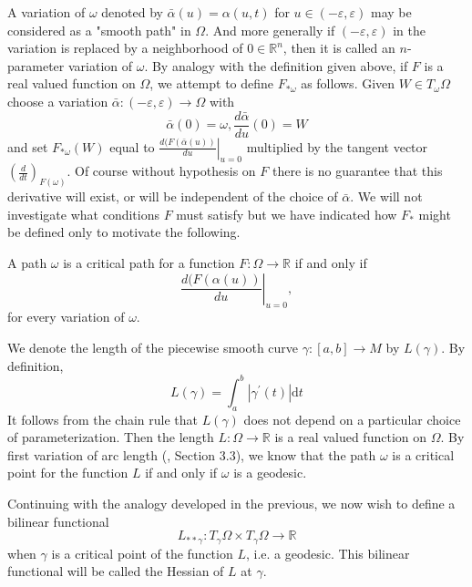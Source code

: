 \documentclass{ctexart}
\begin{document}
A variation of $\omega$ denoted by $\bar{\alpha}(u)=\alpha(u,t)$ for $u\in (-\varepsilon,\varepsilon)$ may be considered as a "smooth path" in $\Omega$. 
And more generally if $(-\varepsilon,\varepsilon)$ in the variation is replaced by a neighborhood of $0\in\mathbb{R}^n$, 
then it is called an $n$-parameter variation of $\omega$. By analogy with the definition given above, if $F$ is a real valued function on $\Omega$, 
we attempt to define $F_{*\omega}$
as follows. Given $W \in T_\omega \Omega$ choose a variation $\bar{\alpha}:(-\varepsilon, \varepsilon) \rightarrow \Omega$ with
$$
\bar{\alpha}(0)=\omega, \frac{d \bar{\alpha}}{d u}(0)=W
$$
and set $F_{* \omega}(W)$ equal to $\left.\frac{d(F(\bar{\alpha}(u))}{d u}\right|_{u=0}$ multiplied by the tangent vector
$\left(\frac{d}{d t}\right)_{F(\omega)}$. Of course without hypothesis on $F$ there is no guarantee that
this derivative will exist, or will be independent of the choice of $\bar{\alpha}$.
We will not investigate what conditions $F$ must satisfy but we have indicated how $F_*$ might be defined only to motivate the following.
\begin{definition}
  A path $\omega$ is a critical path for a function $F: \Omega\rightarrow \mathbb{R}$ if and only if
  $$
  \left.\frac{d(F(\alpha(u))}{d u}\right|_{u=0},
  $$
  for every variation of $\omega$. 
\end{definition}

We denote the length of the piecewise smooth curve $\gamma:[a, b] \rightarrow M$ by $L(\gamma)$. By definition,
$$
L(\gamma)=\int_a^b|\gamma^{\prime}(t)| \mathrm{d} t
$$
It follows from the chain rule that $L(\gamma)$ does not depend on a particular choice of parameterization. Then the length $L: \Omega\rightarrow\mathbb{R}$ is a real valued 
function on $\Omega$. By first variation of arc length (\cite{ChenWeiHuan2002}, Section 3.3), we know that the path $\omega$ is a critical point for the function $L$ if and only if $\omega$ is a geodesic.

Continuing with the analogy developed in the previous, we now wish to define a bilinear functional
$$
L_{* * \gamma}: T_\gamma \Omega\times T_\gamma \Omega\rightarrow \mathbb{R}
$$
when $\gamma$ is a critical point of the function $L$, i.e. a geodesic. This bilinear functional will be called the Hessian of $L$ at $\gamma$.
\end{document}
